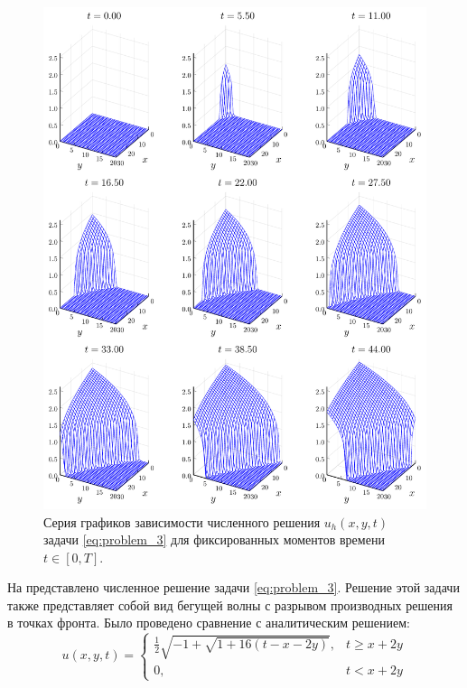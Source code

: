 \begin{figure}
    \centering
    \includegraphics[width=\textwidth, keepaspectratio]{Разностные_схемы_на_статических_сетках/Программный_код_примеры_расчётов/explicit_scheme/problem_3_loc_wireframe.pdf}
    \caption{Серия графиков зависимости численного решения $u_h(x, y, t)$ задачи \eqref{eq:problem_3} для фиксированных моментов времени $t \in [0, T]$.}
    \label{fig:problem_3_wireframe}
\end{figure}
На  представлено численное решение задачи \eqref{eq:problem_3}.
Решение этой задачи также представляет собой вид бегущей волны с разрывом производных решения в точках фронта.
Было проведено сравнение с аналитическим решением:
\begin{equation*}
    u(x, y, t) = \begin{cases}
        \frac{1}{2}\sqrt{-1 + \sqrt{1 + 16(t - x - 2y)}}, & t \ge x + 2y\\
        0, & t < x + 2y
    \end{cases}
\end{equation*}
